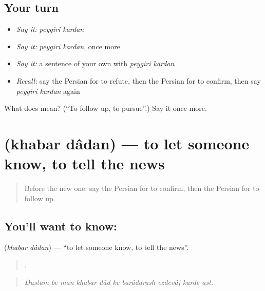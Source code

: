 \subsection*{Your turn}
\begin{itemize}
\raggedright
  \item \emph{Say it:} \emph{peygiri kardan}
  \item \emph{Say it:} \emph{peygiri kardan}, once more
  \item \emph{Say it:} a sentence of your own with \emph{peygiri kardan}
  \item \emph{Recall:} say the Persian for to refute, then the Persian for to confirm, then say \emph{peygiri kardan} again
\end{itemize}

\begin{tcolorbox}[breakable,colback=teal!4,colframe=teal!35!black,title={Before you move on}]
What does   mean? (\textquotedblleft{}To follow up, to pursue\textquotedblright{}.) Say it once more.
\end{tcolorbox}
\section[\texorpdfstring{\fa{خبر} \fa{دادن} (khabar dâdan)}{خبر دادن (khabar dâdan)}]{  (khabar dâdan) — to let someone know, to tell the news}

\label{lesson:FA-C310-khabar-dadan}



\begin{quote}
Before the new one: say the Persian for to confirm, then the Persian for to follow up.
\end{quote}

\subsection*{You'll want to know:  }
\textbf{ } (\emph{khabar dâdan}) — \textquotedblleft{}to let someone know, to tell the news\textquotedblright{}.

\begin{quote}
         .
\end{quote}

\begin{quote}
\emph{Dustam be man khabar dâd ke barâdarash ezdevâj karde ast.}
\end{quote}

